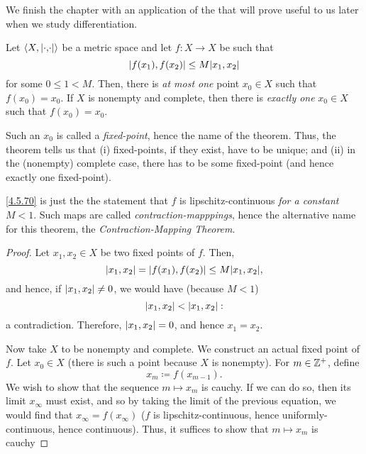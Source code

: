 We finish the chapter with an application of the  that will prove useful to us later when we study differentiation.
\begin{thm}\label{BanachFixedPointTheorem}
Let $\coord{X,\metric}$ be a metric space and let $f:X\rightarrow X$ be such that
\begin{equation}\label{4.5.70}
\metric[f(x_1)][f(x_2)]\leq M\metric[x_1][x_2]
\end{equation}
for some $0\leq 1<M$.  Then, there is \emph{at most one} point $x_0\in X$ such that $f(x_0)=x_0$.  If $X$ is nonempty and complete, then there is \emph{exactly one} $x_0\in X$ such that $f(x_0)=x_0$.
\begin{rmk}
Such an $x_0$ is called a \emph{fixed-point}, hence the name of the theorem.  Thus, the theorem tells us that (i) fixed-points, if they exist, have to be unique; and (ii) in the (nonempty) complete case, there has to be some fixed-point (and hence exactly one fixed-point).
\end{rmk}
\begin{rmk}
\eqref{4.5.70} is just the the statement that $f$ is lipschitz-continuous \emph{for a constant} $M<1$.  Such maps are called \emph{contraction-mapppings}, hence the alternative name for this theorem, the \emph{Contraction-Mapping Theorem}.
\end{rmk}
\begin{proof}
Let $x_1,x_2\in X$ be two fixed points of $f$.  Then,
\begin{equation}
\metric[x_1][x_2]=\metric[f(x_1)][f(x_2)]\leq M\metric[x_1][x_2],
\end{equation}
and hence, if $\metric[x_1][x_2]\neq 0$, we would have (because $M<1$)
\begin{equation}
\metric[x_1][x_2]<\metric[x_1][x_2]:
\end{equation}
a contradiction.  Therefore, $\metric[x_1][x_2]=0$, and hence $x_1=x_2$.

Now take $X$ to be nonempty and complete.  We construct an actual fixed point of $f$.  Let $x_0\in X$ (there is such a point because $X$ is nonempty).  For $m\in \mathbb{Z} ^+$, define
\begin{equation}
x_m\coloneqq f(x_{m-1}).
\end{equation}
We wish to show that the sequence $m\mapsto x_m$ is cauchy.  If we can do so, then its limit $x_\infty$ must exist, and so by taking the limit of the previous equation, we would find that $x_\infty =f(x_\infty )$ ($f$ is lipschitz-continuous, hence uniformly-continuous, hence continuous).  Thus, it suffices to show that $m\mapsto x_m$ is cauchy


\end{proof}
\end{thm}
